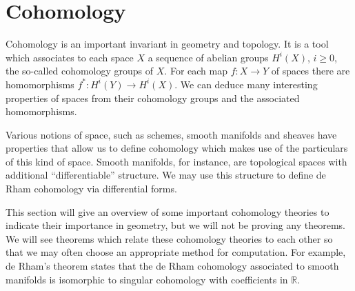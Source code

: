 

\section{Cohomology}
Cohomology is an important invariant in geometry and topology. It is a tool which associates to each space $X$ a sequence of abelian groups $H^i(X)$, $i \ge 0$, the so-called cohomology groups of $X$. For each map $f: X \to Y$ of spaces there are homomorphisms $f^*: H^i(Y) \to H^i(X)$. We can deduce many interesting properties of spaces from their cohomology groups and the associated homomorphisms.

Various notions of space, such as schemes, smooth manifolds and sheaves have properties that allow us to define cohomology which makes use of the particulars of this kind of space. Smooth manifolds, for instance, are topological spaces with additional “differentiable” structure.  We may use this structure to define de Rham cohomology via differential forms.

This section will give an overview of some important cohomology theories to indicate their importance in geometry, but we will not be proving any theorems.
We will see theorems which relate these cohomology theories to each other so that we may often choose an appropriate method for computation. For example, de Rham's theorem states that the de Rham cohomology associated to smooth manifolds is isomorphic to singular cohomology with coefficients in $\mathbb{R}$. 


